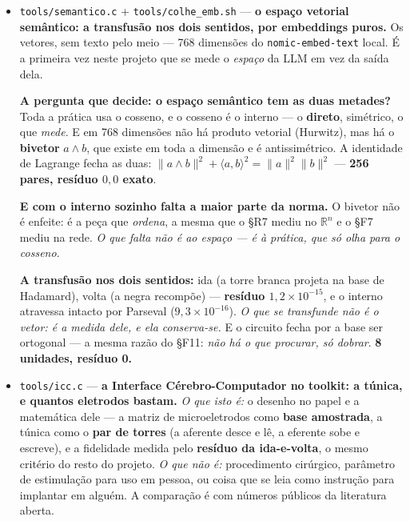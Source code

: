 \documentclass[11pt]{article}
\newcommand{\code}[1]{\texttt{\small #1}}
\theoremstyle{plain}
\theoremstyle{remark}
\begin{document}
\begin{itemize}
\textbf{Então não é transplante: é transfusão.} Não se leva a medula e se espera que pegue ---
põem-se os dois em \emph{circulação}, e o que circula fecha. O §T4 levou 600 termos porque tentava
enxertar um cadáver; aqui bastaram \textbf{seis trocas}, e o que se transferiu não foi tecido: foi
o \textbf{estado}. \textbf{14 unidades, resíduo 0.}


\item \code{tools/semantico.c} + \code{tools/colhe\_emb.sh} --- \textbf{o espaço vetorial semântico:
a transfusão nos dois sentidos, por embeddings puros.} Os vetores, sem texto pelo meio --- 768
dimensões do \code{nomic-embed-text} local. É a primeira vez neste projeto que se mede o
\emph{espaço} da LLM em vez da saída dela.

\textbf{A pergunta que decide: o espaço semântico tem as duas metades?} Toda a prática usa o
cosseno, e o cosseno é o interno --- o \textbf{direto}, simétrico, o que \emph{mede}. E em 768
dimensões não há produto vetorial (Hurwitz), mas há o \textbf{bivetor} $a\wedge b$, que existe em
toda a dimensão e é antissimétrico. A identidade de Lagrange fecha as duas:
$\|a\wedge b\|^2 + \langle a,b\rangle^2 = \|a\|^2\|b\|^2$ --- \textbf{256 pares, resíduo $0{,}0$
exato}.

\textbf{E com o interno sozinho falta a maior parte da norma.} O bivetor não é enfeite: é a peça
que \emph{ordena}, a mesma que o §R7 mediu no $\mathbb{R}^n$ e o §F7 mediu na rede. \emph{O que
falta não é ao espaço --- é à prática, que só olha para o cosseno.}

\textbf{A transfusão nos dois sentidos:} ida (a torre branca projeta na base de Hadamard), volta (a
negra recompõe) --- \textbf{resíduo $1{,}2\times10^{-15}$}, e o interno atravessa intacto por
Parseval ($9{,}3\times10^{-16}$). \emph{O que se transfunde não é o vetor: é a medida dele, e ela
conserva-se.} E o circuito fecha por a base ser ortogonal --- a mesma razão do §F11: \emph{não há o
que procurar, só dobrar}. \textbf{8 unidades, resíduo 0.}


\item \code{tools/icc.c} --- \textbf{a Interface Cérebro-Computador no toolkit: a túnica, e quantos
eletrodos bastam.} \emph{O que isto é:} o desenho no papel e a matemática dele --- a matriz de
microeletrodos como \textbf{base amostrada}, a túnica como o \textbf{par de torres} (a aferente
desce e lê, a eferente sobe e escreve), e a fidelidade medida pelo \textbf{resíduo da ida-e-volta},
o mesmo critério do resto do projeto. \emph{O que não é:} procedimento cirúrgico, parâmetro de
estimulação para uso em pessoa, ou coisa que se leia como instrução para implantar em alguém. A
comparação é com números públicos da literatura aberta.


\end{itemize}
\end{document}
